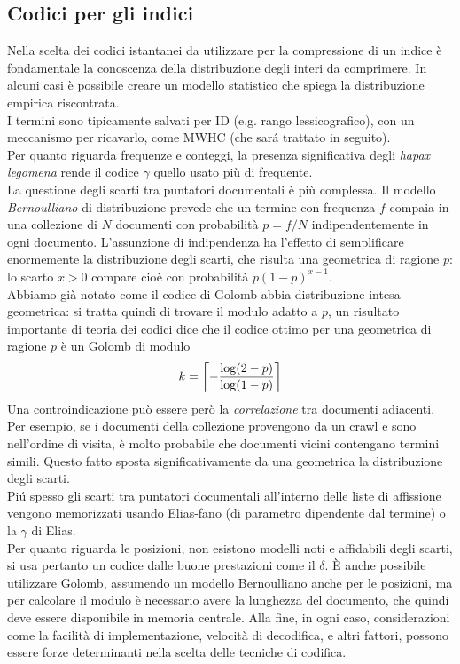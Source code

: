 \subsection{Codici per gli indici}
Nella scelta dei codici istantanei da utilizzare per la compressione di un indice è fondamentale la conoscenza della distribuzione degli interi da comprimere. In alcuni casi è possibile creare un modello statistico che spiega la distribuzione empirica riscontrata.\\
I termini sono tipicamente salvati per ID (e.g. rango lessicografico), con un meccanismo per ricavarlo, come MWHC (che sará trattato in seguito).\\
Per quanto riguarda frequenze e conteggi, la presenza significativa degli \textit{hapax legomena} rende il codice $\gamma$ quello usato più di frequente.\\
La questione degli scarti tra puntatori documentali è più complessa. Il modello \textit{Bernoulliano} di distribuzione prevede che un termine con frequenza $f$ compaia in una collezione di $N$ documenti con probabilità $p = f / N$ indipendentemente in ogni documento. L'assunzione di indipendenza ha l'effetto di semplificare enormemente la distribuzione degli scarti, che risulta una geometrica di ragione $p$: lo scarto $x > 0$ compare cioè con probabilità $p(1 - p)^{x - 1}$.\\
Abbiamo già notato come il codice di Golomb abbia distribuzione intesa geometrica: si tratta quindi di trovare il modulo adatto a $p$, un risultato importante di teoria dei codici dice che il codice ottimo per una geometrica di ragione $p$ è un Golomb di modulo
\begin{equation}
    k = \left\lceil - \frac{\log(2 - p)}{\log(1 - p)} \right\rceil
\end{equation}
Una controindicazione può essere però la \textit{correlazione} tra documenti adiacenti. Per esempio, se i documenti della collezione provengono da un crawl e sono nell'ordine di visita, è molto probabile che documenti vicini contengano termini simili. Questo fatto sposta significativamente da una geometrica la distribuzione degli scarti.\\
Piú spesso gli scarti tra puntatori documentali all'interno delle liste di affissione vengono memorizzati usando Elias-fano (di parametro dipendente dal termine) o la $\gamma$ di Elias.\\
Per quanto riguarda le posizioni, non esistono modelli noti e affidabili degli scarti, si usa pertanto un codice dalle buone prestazioni come il $\delta$. È anche possibile utilizzare Golomb, assumendo un modello Bernoulliano anche per le posizioni, ma per calcolare il modulo è necessario avere la lunghezza del documento, che quindi deve essere disponibile in memoria centrale. Alla fine, in ogni caso, considerazioni come la facilità di implementazione, velocità di decodifica, e altri fattori, possono essere forze determinanti nella scelta delle tecniche di codifica.
